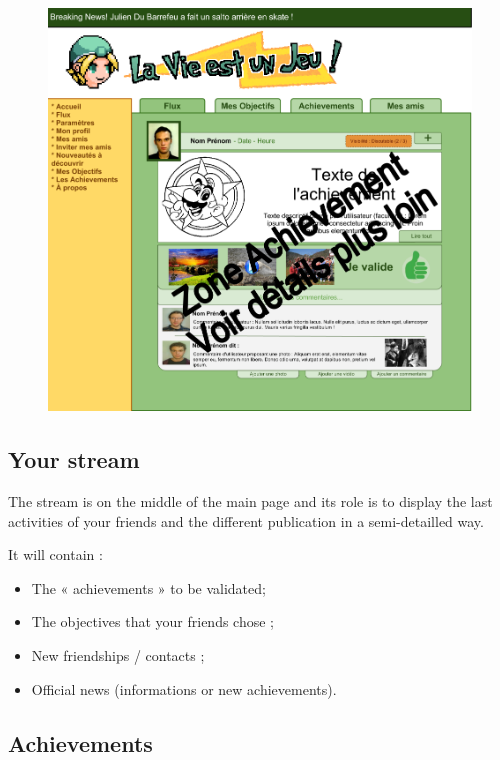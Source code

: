 \documentclass{life-en}
\begin{document}
\begin{figure}[H]
	\begin{center}
		\includegraphics[width=15cm]{img/accueil.png}
	\end{center}
\end{figure}


\subsection{Your stream}

The stream is on the middle of the main page and its role is to display the last activities of your friends and the different publication in a semi-detailled way.

It will contain :
\begin{itemize}
	\item The « achievements » to be validated;
	\item The objectives that your friends chose ;
	\item New friendships / contacts ;
	\item Official news (informations or new achievements).
\end{itemize}

\newpage

\subsection{Achievements}
\end{document}
